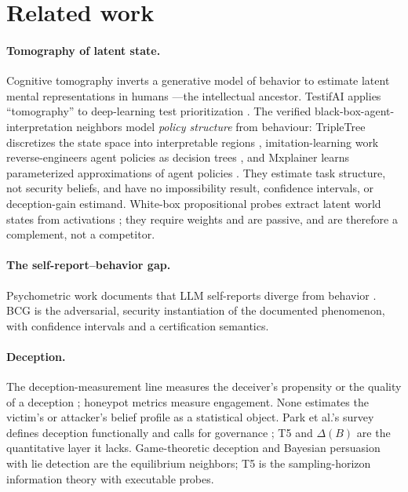 \documentclass[10pt,twocolumn]{article}
\begin{document}
\section{Related work}\label{sec:related}

\paragraph{Tomography of latent state.}
Cognitive tomography inverts a generative model of behavior to estimate latent
mental representations in humans \cite{houlsby2013}---the intellectual ancestor.
TestifAI applies ``tomography'' to deep-learning test prioritization
\cite{testifai}. The verified black-box-agent-interpretation neighbors model
\emph{policy structure} from behaviour: TripleTree discretizes the state space
into interpretable regions \cite{tripletree2020}, imitation-learning work
reverse-engineers agent policies as decision trees \cite{bewley2020}, and
Mxplainer learns parameterized approximations of agent policies
\cite{mxplainer2025}. They estimate task structure, not security beliefs, and
have no impossibility result, confidence intervals, or deception-gain estimand.
White-box propositional probes extract latent world states from activations
\cite{feng2024}; they require weights and are passive, and are therefore a
complement, not a competitor.

\paragraph{The self-report--behavior gap.}
Psychometric work documents that LLM self-reports diverge from behavior
\cite{shen2025,valuebench}. BCG is the adversarial, security instantiation of
the documented phenomenon, with confidence intervals and a certification
semantics.

\paragraph{Deception.}
The deception-measurement line measures the deceiver's propensity or the
quality of a deception \cite{decepeval,rowe2006}; honeypot metrics measure
engagement. None estimates the victim's or attacker's belief profile as a
statistical object. Park et al.'s survey defines deception functionally and
calls for governance \cite{park2024}; T5 and $\Delta(B)$ are the quantitative
layer it lacks. Game-theoretic deception \cite{nguyen2019} and Bayesian
persuasion with lie detection \cite{kamenica2011,nberlie} are the equilibrium
neighbors; T5 is the sampling-horizon information theory with executable probes.
\end{document}
